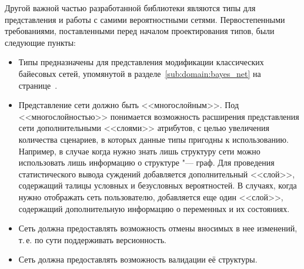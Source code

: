 Другой важной частью разработанной библиотеки являются типы для представления и работы с самими вероятностными сетями.
Первостепенными требованиями, поставленными перед началом проектирования типов, были следующие пункты:
\begin{itemize}
  \item Типы предназначены для представления модификации классических байесовых сетей, упомянутой в разделе~\ref{sub:domain:bayes_net} на странице~\pageref{page:domain:bayes_mod}.
  \item Представление сети должно быть <<многослойным>>.
  Под <<многослойностью>> понимается возможность расширения представления сети дополнительными <<слоями>> атрибутов, с целью увеличения количества сценариев, в которых данные типы пригодны к использованию.
  Например, в случае когда нужно знать лишь структуру сети можно использовать лишь информацию о структуре "--- граф.
  Для проведения статистического вывода суждений добавляется дополнительный <<слой>>, содержащий талицы условных и безусловных вероятностей.
  В случаях, когда нужно отображать сеть пользователю, добавляется еще один <<слой>>, содержащий дополнительную информацию о переменных и их состояниях. 
  \item Сеть должна предоставлять возможность отмены вносимых в нее изменений, т.\,е. по сути поддерживать версионность.
  \item Сеть должна предоставлять возможность валидации её структуры. 
\end{itemize}

